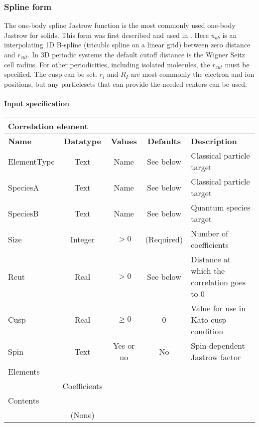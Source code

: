 \subsubsection{Spline form}
\label{sec:onebodyjastrowspline}

The one-body spline Jastrow function is the most commonly used one-body Jastrow for solids. This form 
was first described and used in \cite{EslerKimCeperleyShulenburger2012}.  
Here $u_{ab}$ is an interpolating 1D B-spline (tricublc spline on a linear grid) between zero distance and $r_{cut}$. In 3D periodic systems 
the default cutoff distance is the Wigner Seitz cell radius. For other periodicities, including isolated 
molecules, the $r_{cut}$ must be specified. The cusp can be set.   $r_i$ 
and $R_I$ are most commonly the electron and ion positions, but any particlesets that can provide the 
needed centers can be used.

\paragraph{Input specification}
\begin{table}[h]
\begin{center}
\begin{tabular}{l c c c l }
\hline
\multicolumn{5}{l}{Correlation element} \\
\hline
\bfseries Name & \bfseries Datatype & \bfseries Values & \bfseries Defaults & \bfseries Description \\
\hline
ElementType & Text & Name & See below & Classical particle target  \\
SpeciesA & Text & Name & See below & Classical particle target \\
SpeciesB & Text & Name & See below & Quantum species target \\
Size & Integer & $> 0$ & (Required) & Number of coefficients \\
Rcut & Real & $> 0$ & See below & Distance at which the correlation goes to 0 \\
Cusp & Real & $\ge 0$ & 0 & Value for use in Kato cusp condition \\
Spin & Text & Yes or no & No & Spin-dependent Jastrow factor \\
\hline
\multicolumn{5}{l}{Elements}\\ \hline
& Coefficients & & & \\ \hline
\multicolumn{5}{l}{Contents}\\ \hline
& (None)  & & &  \\ \hline
\end{tabular}
\end{center}
\end{table}

